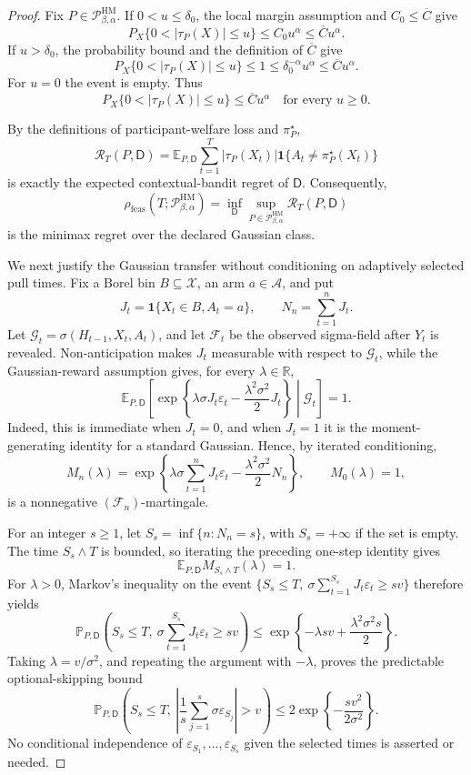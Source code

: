 \documentclass{article}
\begin{document}
\begin{proof}
Fix \(P\in\mathcal P_{\beta,\alpha}^{\mathrm{HM}}\).  If \(0<u\leq\delta_0\), the local margin assumption and \(C_0\leq\overline C\) give
\[
 P_X\{0<|\tau_P(X)|\leq u\}\leq C_0u^\alpha
 \leq\overline C u^\alpha.
\]
If \(u>\delta_0\), the probability bound and the definition of \(\overline C\) give
\[
 P_X\{0<|\tau_P(X)|\leq u\}\leq1
 \leq\delta_0^{-\alpha}u^\alpha
 \leq\overline C u^\alpha.
\]
For \(u=0\) the event is empty.  Thus
\[
 P_X\{0<|\tau_P(X)|\leq u\}\leq\overline C u^\alpha
 \quad\text{for every }u\geq0.
\]

By the definitions of participant-welfare loss and \(\pi_P^\star\),
\[
 \mathcal R_T(P,\mathsf D)
 =\mathbb E_{P,\mathsf D}\sum_{t=1}^T
 |\tau_P(X_t)|\mathbf 1\{A_t\ne\pi_P^\star(X_t)\}
\]
is exactly the expected contextual-bandit regret of \(\mathsf D\).  Consequently,
\[
 \rho_{\mathrm{feas}}(T;\mathcal P_{\beta,\alpha}^{\mathrm{HM}})
 =\inf_{\mathsf D}\sup_{P\in\mathcal P_{\beta,\alpha}^{\mathrm{HM}}}
 \mathcal R_T(P,\mathsf D)
\]
is the minimax regret over the declared Gaussian class.

We next justify the Gaussian transfer without conditioning on adaptively selected pull times.  Fix a Borel bin \(B\subseteq\mathcal X\), an arm \(a\in\mathcal A\), and put
\[
 J_t=\mathbf 1\{X_t\in B,A_t=a\},
 \qquad N_n=\sum_{t=1}^nJ_t.
\]
Let \(\mathcal G_t=\sigma(H_{t-1},X_t,A_t)\), and let \(\mathcal F_t\) be the observed sigma-field after \(Y_t\) is revealed.  Non-anticipation makes \(J_t\) measurable with respect to \(\mathcal G_t\), while the Gaussian-reward assumption gives, for every \(\lambda\in\mathbb R\),
\[
 \mathbb E_{P,\mathsf D}\!\left[
  \exp\!\left\{\lambda\sigma J_t\varepsilon_t
  -\frac{\lambda^2\sigma^2}{2}J_t\right\}
  \middle|\mathcal G_t\right]=1.
\]
Indeed, this is immediate when \(J_t=0\), and when \(J_t=1\) it is the moment-generating identity for a standard Gaussian.  Hence, by iterated conditioning,
\[
 M_n(\lambda)=\exp\!\left\{
 \lambda\sigma\sum_{t=1}^nJ_t\varepsilon_t
 -\frac{\lambda^2\sigma^2}{2}N_n\right\},
 \qquad M_0(\lambda)=1,
\]
is a nonnegative \((\mathcal F_n)\)-martingale.

For an integer \(s\geq1\), let \(S_s=\inf\{n:N_n=s\}\), with \(S_s=+\infty\) if the set is empty.  The time \(S_s\wedge T\) is bounded, so iterating the preceding one-step identity gives
\[
 \mathbb E_{P,\mathsf D}M_{S_s\wedge T}(\lambda)=1.
\]
For \(\lambda>0\), Markov's inequality on the event \(\{S_s\leq T,\ \sigma\sum_{t=1}^{S_s}J_t\varepsilon_t\geq sv\}\) therefore yields
\[
 \mathbb P_{P,\mathsf D}\!\left(
 S_s\leq T,\ \sigma\sum_{t=1}^{S_s}J_t\varepsilon_t\geq sv
 \right)
 \leq\exp\!\left\{-\lambda sv+\frac{\lambda^2\sigma^2s}{2}\right\}.
\]
Taking \(\lambda=v/\sigma^2\), and repeating the argument with \(-\lambda\), proves the predictable optional-skipping bound
\[
 \mathbb P_{P,\mathsf D}\!\left(
 S_s\leq T,\ 
 \left|\frac1s\sum_{j=1}^s\sigma\varepsilon_{S_j}\right|>v
 \right)
 \leq2\exp\!\left\{-\frac{sv^2}{2\sigma^2}\right\}.
\]
No conditional independence of \(\varepsilon_{S_1},\ldots,\varepsilon_{S_s}\) given the selected times is asserted or needed.


\end{proof}
\end{document}

